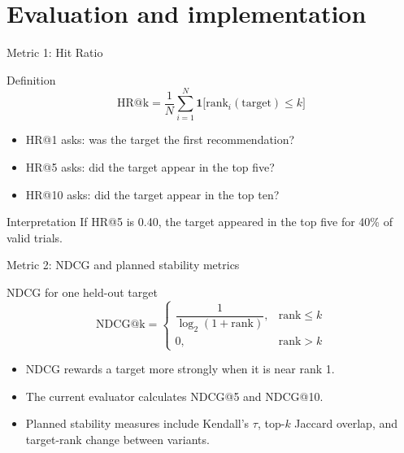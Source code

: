 \documentclass[aspectratio=169,12pt]{beamer}
\begin{document}
\section{Evaluation and implementation}

\begin{frame}{Metric 1: Hit Ratio}
\begin{block}{Definition}
\[
\mathrm{HR@k} =
\frac{1}{N}\sum_{i=1}^{N}
\mathbf{1}\bigl[\mathrm{rank}_i(\mathrm{target}) \leq k\bigr]
\]
\end{block}

\begin{itemize}
  \item HR@1 asks: was the target the first recommendation?
  \item HR@5 asks: did the target appear in the top five?
  \item HR@10 asks: did the target appear in the top ten?
\end{itemize}

\begin{exampleblock}{Interpretation}
If HR@5 is 0.40, the target appeared in the top five for 40\% of valid trials.
\end{exampleblock}
\end{frame}

\begin{frame}{Metric 2: NDCG and planned stability metrics}
\begin{block}{NDCG for one held-out target}
\[
\mathrm{NDCG@k} =
\begin{cases}
\dfrac{1}{\log_2(1+\mathrm{rank})}, & \mathrm{rank}\leq k\\[0.6em]
0, & \mathrm{rank}>k
\end{cases}
\]
\end{block}

\begin{itemize}
  \item NDCG rewards a target more strongly when it is near rank 1.
  \item The current evaluator calculates NDCG@5 and NDCG@10.
  \item Planned stability measures include Kendall's $\tau$, top-$k$ Jaccard
        overlap, and target-rank change between variants.
\end{itemize}
\end{frame}
\end{document}
